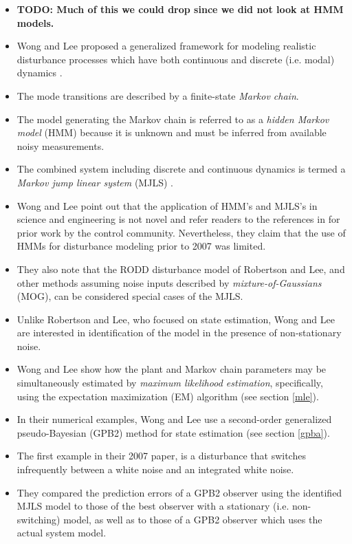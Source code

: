 \begin{itemize}
	\item \textbf{TODO: Much of this we could drop since we did not look at HMM models.}
	\item Wong and Lee proposed a generalized framework for modeling realistic disturbance processes which have both continuous and discrete (i.e. modal) dynamics \citep{wong_disturbance_2007}.
	\item The mode transitions are described by a finite-state \textit{Markov chain}.
	\item The model generating the Markov chain is referred to as a \textit{hidden Markov model} (HMM) because it is unknown and must be inferred from available noisy measurements.
	\item The combined system including discrete and continuous dynamics is termed a \textit{Markov jump linear system} (MJLS) \citep{costa_discrete-time_2005}.
	\item Wong and Lee point out that the application of HMM's and MJLS's in science and engineering is not novel and refer readers to the references in \cite{costa_discrete-time_2005} for prior work by the control community. Nevertheless, they claim that the use of HMMs for disturbance modeling prior to 2007 was limited.
	\item They also note that the RODD disturbance model of Robertson and Lee, and other methods assuming noise inputs described by \textit{mixture-of-Gaussians} (MOG), can be considered special cases of the MJLS.
	\item Unlike Robertson and Lee, who focused on state estimation, Wong and Lee are interested in identification of the model in the presence of non-stationary noise.
	\item Wong and Lee show how the plant and Markov chain parameters may be simultaneously estimated by \textit{maximum likelihood estimation}, specifically, using the expectation maximization (EM) algorithm (see section \ref{mle}).
	\item In their numerical examples, Wong and Lee use a second-order generalized pseudo-Bayesian (GPB2)  method for state estimation \citep{bar-shalom_estimation_1993} (see section \ref{gpba}).
	\item The first example in their 2007 paper, is a disturbance that switches infrequently between a white noise and an integrated white noise.
	\item They compared the prediction errors of a GPB2 observer using the identified MJLS model to those of the best observer with a stationary (i.e. non-switching) model, as well as to those of a GPB2 observer which uses the actual system model.

\end{itemize}
